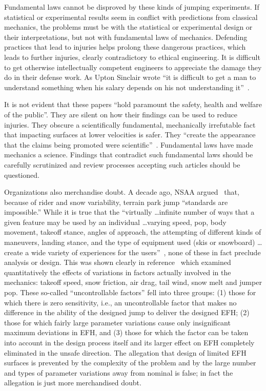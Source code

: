 \documentclass[smallextended]{svjour3}       %
\begin{document}
Fundamental laws cannot be disproved by these kinds of jumping experiments. If
statistical or experimental results seem in conflict with predictions from
classical mechanics, the problems must be with the statistical or experimental
design or their interpretations, but not with fundamental laws of mechanics.
Defending practices that lead to injuries helps prolong these dangerous
practices, which leads to further injuries, clearly contradictory to ethical
engineering. It is difficult to get otherwise intellectually competent
engineers to appreciate the damage they do in their defense work. As Upton
Sinclair wrote ``it is difficult to get a man to understand something when his
salary depends on his not understanding it''~\cite{Sinclair1994}.

It is not evident that these papers ``hold paramount the safety, health and
welfare of the public''. They are silent on how their findings can be used to
reduce injuries. They obscure a scientifically fundamental, mechanically
irrefutable fact that impacting surfaces at lower velocities is safer. They
``create the appearance that the claims being promoted were
scientific''~\cite[page 244]{Oreskes2010}. Fundamental laws have made mechanics a
science. Findings that contradict such fundamental laws should be carefully
scrutinized and review processes accepting such articles should be
questioned.

Organizations also merchandise doubt. A decade ago, NSAA argued~\cite{NSAA2008}
that, because of rider and snow variability, terrain park jump ``standards are
impossible.'' While it is true that the ``virtually \ldots infinite number of
ways that a given feature may be used by an individual \ldots varying speed,
pop, body movement, takeoff stance, angles of approach, the attempting of
different kinds of maneuvers, landing stance, and the type of equipment used
(skis or snowboard) \ldots create a wide variety of experiences for the
users''~\cite{NSAA2008}, none of these in fact preclude analysis or design.
This was shown clearly in reference~\cite{Hubbard2012} which examined
quantitatively the effects of variations in factors actually involved in the
mechanics: takeoff speed, snow friction, air drag, tail wind, snow melt and
jumper pop. These so-called ``uncontrollable factors'' fell into three groups:
(1) those for which there is zero sensitivity, i.e., an uncontrollable factor
that makes no difference in the ability of the designed jump to deliver the
designed EFH; (2) those for which fairly large parameter variations cause only
insignificant maximum deviations in EFH, and (3) those for which the factor can
be taken into account in the design process itself and its larger effect on EFH
completely eliminated in the unsafe direction. The allegation that design of
limited EFH surfaces is prevented by the complexity of the problem and by the
large number and types of parameter variations away from nominal is false; in
fact the allegation is just more merchandised doubt.
\end{document}
